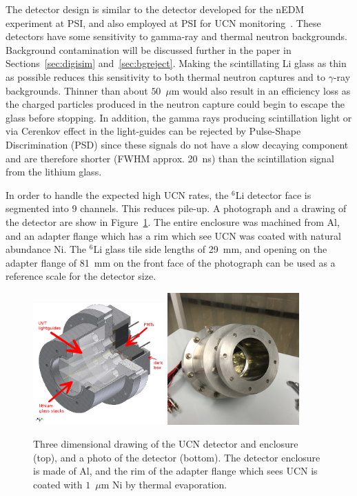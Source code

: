 \documentclass[twocolumn]{bmcart}
\begin{document}
The detector design is similar to the detector developed for the nEDM
experiment at PSI, and also employed at PSI for UCN
monitoring~\cite{LGoeltl}.  These detectors have some sensitivity to
gamma-ray and thermal neutron backgrounds.  Background contamination
will be discussed further in the paper in Sections~\ref{sec:digisim}
and~\ref{sec:bgreject}.  Making the scintillating Li glass as thin as possible
reduces this sensitivity to both thermal neutron captures and to
$\gamma$-ray backgrounds.  Thinner than about $50$~$\mu$m would also
result in an efficiency loss as the charged particles produced in the
neutron capture could begin to escape the glass before stopping.  In
addition, the gamma rays producing scintillation light or via Cerenkov
effect in the light-guides can be rejected by Pulse-Shape
Discrimination (PSD) since these signals do not have a slow decaying
component and are therefore shorter (FWHM approx. 20~ns) than the
scintillation signal from the lithium glass.

In order to handle the expected high UCN rates, the $^6$Li detector
face is segmented into 9 channels.  This reduces pile-up.  A
photograph and a drawing of the detector are show in
Figure~\ref{fig:detdesigned}.  The entire enclosure was machined from
Al, and an adapter flange which has a rim which see UCN was coated
with natural abundance Ni.  The ${^6}$Li glass tile side lengths of
29~mm, and opening on the adapter flange of 81~mm on the front face of
the photograph can be used as a reference scale for the detector size.

\begin{figure}[!htpb] 
\includegraphics[width=0.45\textwidth]{figures/detdesigned.png} 
\includegraphics[width=0.45\textwidth]{figures/ucndet.png} 
\caption{\label{fig:detdesigned} Three dimensional drawing of the UCN
  detector and enclosure (top), and a photo of the detector (bottom).
  The detector enclosure is made of Al, and the rim of the adapter
  flange which sees UCN is coated with $1$~$\mu$m Ni by thermal
  evaporation.}
\end{figure} 
\end{document}
